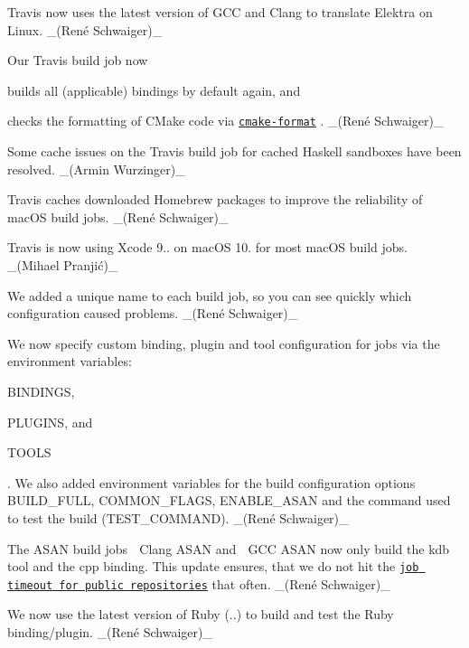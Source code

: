 \begin{DoxyItemize}
\item Travis now uses the latest version of G\+CC and Clang to translate Elektra on Linux. \+\_\+(René Schwaiger)\+\_\+
\item Our Travis build job now
\begin{DoxyItemize}
\item builds all (applicable) bindings by default again, and
\item checks the formatting of C\+Make code via \href{https://github.com/cheshirekow/cmake_format}{\tt {\ttfamily cmake-\/format}} . \+\_\+(René Schwaiger)\+\_\+
\end{DoxyItemize}
\item Some cache issues on the Travis build job for cached Haskell sandboxes have been resolved. \+\_\+(\+Armin Wurzinger)\+\_\+
\item Travis caches downloaded Homebrew packages to improve the reliability of mac\+OS build jobs. \+\_\+(René Schwaiger)\+\_\+
\item Travis is now using Xcode 9.. on mac\+OS 10. for most mac\+OS build jobs. \+\_\+(Mihael Pranjić)\+\_\+
\item We added a unique name to each build job, so you can see quickly which configuration caused problems. \+\_\+(René Schwaiger)\+\_\+
\item We now specify custom binding, plugin and tool configuration for jobs via the environment variables\+:
\begin{DoxyItemize}
\item {\ttfamily B\+I\+N\+D\+I\+N\+GS},
\item {\ttfamily P\+L\+U\+G\+I\+NS}, and
\item {\ttfamily T\+O\+O\+LS}
\end{DoxyItemize}

. We also added environment variables for the build configuration options {\ttfamily B\+U\+I\+L\+D\+\_\+\+F\+U\+LL}, {\ttfamily C\+O\+M\+M\+O\+N\+\_\+\+F\+L\+A\+GS}, {\ttfamily E\+N\+A\+B\+L\+E\+\_\+\+A\+S\+AN} and the command used to test the build ({\ttfamily T\+E\+S\+T\+\_\+\+C\+O\+M\+M\+A\+ND}). \+\_\+(René Schwaiger)\+\_\+
\item The A\+S\+AN build jobs {\ttfamily 🍏 Clang A\+S\+AN} and {\ttfamily 🐧 G\+CC A\+S\+AN} now only build the {\ttfamily kdb} tool and the {\ttfamily cpp} binding. This update ensures, that we do not hit the \href{https://docs.travis-ci.com/user/customizing-the-build/#build-timeouts}{\tt job timeout for public repositories} that often. \+\_\+(René Schwaiger)\+\_\+
\item We now use the latest version of Ruby ({..}) to build and test the Ruby binding/plugin. \+\_\+(René Schwaiger)\+\_\+
\end{DoxyItemize}

